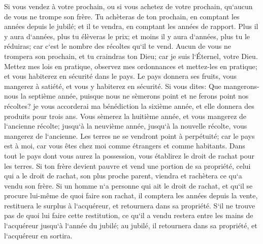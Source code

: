 \verse Si vous vendez à votre prochain, ou si vous achetez de votre prochain, qu`aucun de vous ne trompe son frère. 
\verse Tu achèteras de ton prochain, en comptant les années depuis le jubilé; et il te vendra, en comptant les années de rapport. 
\verse Plus il y aura d`années, plus tu élèveras le prix; et moins il y aura d`années, plus tu le réduiras; car c`est le nombre des récoltes qu`il te vend. 
\verse Aucun de vous ne trompera son prochain, et tu craindras ton Dieu; car je suis l`Éternel, votre Dieu. 
\verse Mettez mes lois en pratique, observez mes ordonnances et mettez-les en pratique; et vous habiterez en sécurité dans le pays. 
\verse Le pays donnera ses fruits, vous mangerez à satiété, et vous y habiterez en sécurité. 
\verse Si vous dites: Que mangerons-nous la septième année, puisque nous ne sèmerons point et ne ferons point nos récoltes? 
\verse je vous accorderai ma bénédiction la sixième année, et elle donnera des produits pour trois ans. 
\verse Vous sèmerez la huitième année, et vous mangerez de l`ancienne récolte; jusqu`à la neuvième année, jusqu`à la nouvelle récolte, vous mangerez de l`ancienne. 
\verse Les terres ne se vendront point à perpétuité; car le pays est à moi, car vous êtes chez moi comme étrangers et comme habitants. 
\verse Dans tout le pays dont vous aurez la possession, vous établirez le droit de rachat pour les terres. 
\verse Si ton frère devient pauvre et vend une portion de sa propriété, celui qui a le droit de rachat, son plus proche parent, viendra et rachètera ce qu`a vendu son frère. 
\verse Si un homme n`a personne qui ait le droit de rachat, et qu`il se procure lui-même de quoi faire son rachat, 
\verse il comptera les années depuis la vente, restituera le surplus à l`acquéreur, et retournera dans sa propriété. 
\verse S`il ne trouve pas de quoi lui faire cette restitution, ce qu`il a vendu restera entre les mains de l`acquéreur jusqu`à l`année du jubilé; au jubilé, il retournera dans sa propriété, et l`acquéreur en sortira. 
